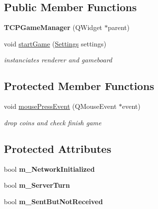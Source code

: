 \subsection*{\-Public \-Member \-Functions}
\begin{DoxyCompactItemize}
\item 
\hypertarget{classTCPGameManager_a0a83c4efd02332883aaa7935b480ec2c}{{\bfseries \-T\-C\-P\-Game\-Manager} (\-Q\-Widget $\ast$parent)}\label{classTCPGameManager_a0a83c4efd02332883aaa7935b480ec2c}

\item 
\hypertarget{classTCPGameManager_a7d4415253458e80a05314f91a0879fd0}{void \hyperlink{classTCPGameManager_a7d4415253458e80a05314f91a0879fd0}{start\-Game} (\hyperlink{structSettings}{\-Settings} settings)}\label{classTCPGameManager_a7d4415253458e80a05314f91a0879fd0}

\begin{DoxyCompactList}\small\item\em instanciates renderer and gameboard \end{DoxyCompactList}\end{DoxyCompactItemize}
\subsection*{\-Protected \-Member \-Functions}
\begin{DoxyCompactItemize}
\item 
\hypertarget{classTCPGameManager_af76ec973ba1c3e7f58ac979fffccb85f}{void \hyperlink{classTCPGameManager_af76ec973ba1c3e7f58ac979fffccb85f}{mouse\-Press\-Event} (\-Q\-Mouse\-Event $\ast$event)}\label{classTCPGameManager_af76ec973ba1c3e7f58ac979fffccb85f}

\begin{DoxyCompactList}\small\item\em drop coins and check finish game \end{DoxyCompactList}\end{DoxyCompactItemize}
\subsection*{\-Protected \-Attributes}
\begin{DoxyCompactItemize}
\item 
\hypertarget{classTCPGameManager_aabea99b1b4ed457eff4a5f0db194644b}{bool {\bfseries m\-\_\-\-Network\-Initialized}}\label{classTCPGameManager_aabea99b1b4ed457eff4a5f0db194644b}

\item 
\hypertarget{classTCPGameManager_a762b0b3ae60c0076165843b78d011927}{bool {\bfseries m\-\_\-\-Server\-Turn}}\label{classTCPGameManager_a762b0b3ae60c0076165843b78d011927}

\item 
\hypertarget{classTCPGameManager_ad973154be37079b7510d4ca3d66d47fb}{bool {\bfseries m\-\_\-\-Sent\-But\-Not\-Received}}\label{classTCPGameManager_ad973154be37079b7510d4ca3d66d47fb}

\end{DoxyCompactItemize}


